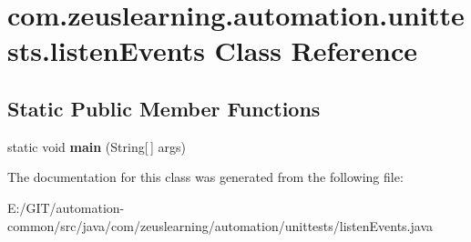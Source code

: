 \hypertarget{classcom_1_1zeuslearning_1_1automation_1_1unittests_1_1listenEvents}{}\section{com.\+zeuslearning.\+automation.\+unittests.\+listen\+Events Class Reference}
\label{classcom_1_1zeuslearning_1_1automation_1_1unittests_1_1listenEvents}
\subsection*{Static Public Member Functions}
\begin{DoxyCompactItemize}
\item 
\hypertarget{classcom_1_1zeuslearning_1_1automation_1_1unittests_1_1listenEvents_a47617427413d1c9a7000ae1a9fd41b1b}{}\label{classcom_1_1zeuslearning_1_1automation_1_1unittests_1_1listenEvents_a47617427413d1c9a7000ae1a9fd41b1b} 
static void {\bfseries main} (String\mbox{[}$\,$\mbox{]} args)
\end{DoxyCompactItemize}


The documentation for this class was generated from the following file\+:\begin{DoxyCompactItemize}
\item 
E\+:/\+G\+I\+T/automation-\/common/src/java/com/zeuslearning/automation/unittests/listen\+Events.\+java\end{DoxyCompactItemize}
